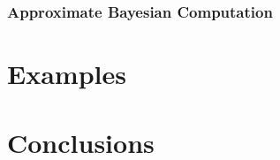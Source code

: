 \documentclass[
]{jss}
\begin{document}
\hypertarget{approximate-bayesian-computation}{%
\subsubsection{Approximate Bayesian
Computation}\label{approximate-bayesian-computation}}

\hypertarget{EX}{%
\section{Examples}\label{EX}}

\hypertarget{CON}{%
\section{Conclusions}\label{CON}}

\renewcommand\refname{References}

\end{document}
